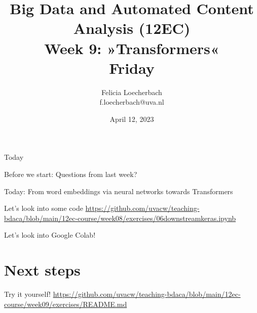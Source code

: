 \documentclass[compress]{beamer}
\begin{document}
\title[Big Data and Automated Content Analysis]{\textbf{Big Data and Automated Content Analysis (12EC)} 
\\Week 9: »Transformers«
\\Friday}
\author[Felicia Loecherbach]{Felicia Loecherbach\\ \footnotesize{f.loecherbach@uva.nl \\}}
\date{April 12, 2023}


\begin{frame}{}
	\titlepage
\end{frame}

\begin{frame}{Today}
	\tableofcontents
\end{frame}
\begin{frame}[standout]
Before we start: Questions from last week?
\end{frame}


\begin{frame}[standout]
Today: From word embeddings via neural networks towards Transformers
\end{frame}




\begin{frame}{Let's look into some code}
\url{https://github.com/uvacw/teaching-bdaca/blob/main/12ec-course/week08/exercises/06downstreamkeras.ipynb}
\end{frame}




\begin{frame}[standout]
Let's look into Google Colab!
\end{frame}


\section{Next steps}
\begin{frame}[standout]
Try it yourself!
\url{https://github.com/uvacw/teaching-bdaca/blob/main/12ec-course/week09/exercises/README.md}
\end{frame}


\begin{frame}
\printbibliography
\end{frame}
\end{document}
